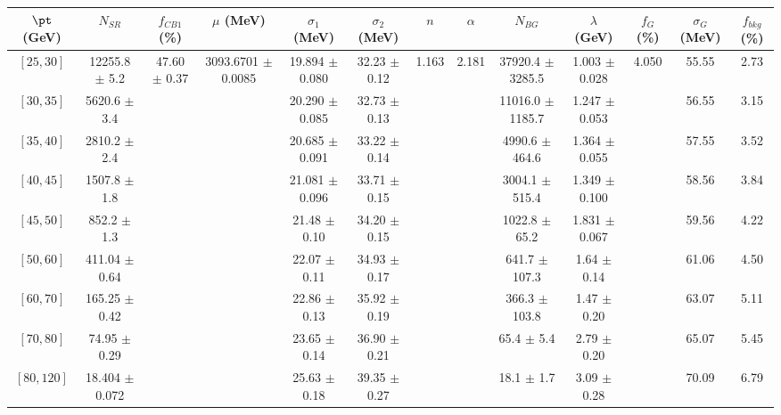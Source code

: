 \begin{tabular}{c||c|c|c|c|c|c|c|c|c|c|c||c}
$\pt$ (GeV) & $N_{SR}$ & $f_{CB1}$ (\%) & $\mu$ (MeV) & $\sigma_1$ (MeV) & $\sigma_2$ (MeV) & $n$ & $\alpha$ & $N_{BG}$ & $\lambda$ (GeV) & $f_G$ (\%) & $\sigma_G$ (MeV) & $f_{bkg}$ (\%) \\
\hline
$[25, 30]$ & 12255.8 $\pm$ 5.2 & \multirow{9}{*}{47.60 $\pm$ 0.37} & \multirow{9}{*}{3093.6701 $\pm$ 0.0085} & 19.894 $\pm$ 0.080 & 32.23 $\pm$ 0.12 & \multirow{9}{*}{1.163} & \multirow{9}{*}{2.181} & 37920.4 $\pm$ 3285.5 & 1.003 $\pm$ 0.028 & \multirow{9}{*}{4.050} & 55.55 & 2.73\\
$[30, 35]$ & 5620.6 $\pm$ 3.4 &  &  & 20.290 $\pm$ 0.085 & 32.73 $\pm$ 0.13 &  &  & 11016.0 $\pm$ 1185.7 & 1.247 $\pm$ 0.053 &  & 56.55 & 3.15\\
$[35, 40]$ & 2810.2 $\pm$ 2.4 &  &  & 20.685 $\pm$ 0.091 & 33.22 $\pm$ 0.14 &  &  & 4990.6 $\pm$ 464.6 & 1.364 $\pm$ 0.055 &  & 57.55 & 3.52\\
$[40, 45]$ & 1507.8 $\pm$ 1.8 &  &  & 21.081 $\pm$ 0.096 & 33.71 $\pm$ 0.15 &  &  & 3004.1 $\pm$ 515.4 & 1.349 $\pm$ 0.100 &  & 58.56 & 3.84\\
$[45, 50]$ & 852.2 $\pm$ 1.3 &  &  & 21.48 $\pm$ 0.10 & 34.20 $\pm$ 0.15 &  &  & 1022.8 $\pm$ 65.2 & 1.831 $\pm$ 0.067 &  & 59.56 & 4.22\\
$[50, 60]$ & 411.04 $\pm$ 0.64 &  &  & 22.07 $\pm$ 0.11 & 34.93 $\pm$ 0.17 &  &  & 641.7 $\pm$ 107.3 & 1.64 $\pm$ 0.14 &  & 61.06 & 4.50\\
$[60, 70]$ & 165.25 $\pm$ 0.42 &  &  & 22.86 $\pm$ 0.13 & 35.92 $\pm$ 0.19 &  &  & 366.3 $\pm$ 103.8 & 1.47 $\pm$ 0.20 &  & 63.07 & 5.11\\
$[70, 80]$ & 74.95 $\pm$ 0.29 &  &  & 23.65 $\pm$ 0.14 & 36.90 $\pm$ 0.21 &  &  & 65.4 $\pm$ 5.4 & 2.79 $\pm$ 0.20 &  & 65.07 & 5.45\\
$[80, 120]$ & 18.404 $\pm$ 0.072 &  &  & 25.63 $\pm$ 0.18 & 39.35 $\pm$ 0.27 &  &  & 18.1 $\pm$ 1.7 & 3.09 $\pm$ 0.28 &  & 70.09 & 6.79\\
\end{tabular}

